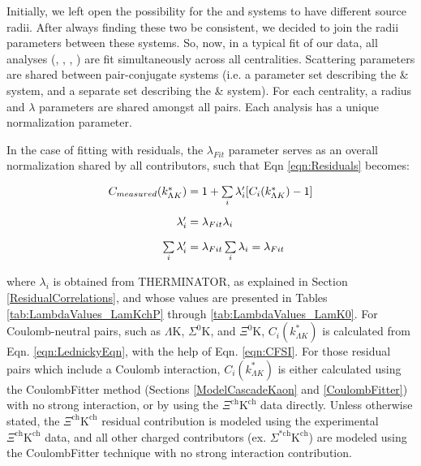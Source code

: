 \documentclass[../AnalysisNoteJBuxton.tex]{subfiles}
\begin{document}
Initially, we left open the possibility for the \LamKchPALamKchM and \LamKchMALamKchP systems to have different source radii.  After always finding these two be consistent, we decided to join the radii parameters between these systems.  So, now, in a typical fit of our \LamKpm data, all \LamKpm analyses (\LamKchP, \ALamKchM, \LamKchM, \ALamKchP) are fit simultaneously across all centralities.  Scattering parameters are shared between pair-conjugate systems (i.e. a parameter set describing the \LamKchP \& \ALamKchM system, and a separate set describing the \LamKchM \& \ALamKchP system).  For each centrality, a radius and $\lambda$ parameters are shared amongst all pairs.  Each analysis has a unique normalization parameter.

In the case of fitting with residuals, the $\lambda_{Fit}$ parameter serves as an overall normalization shared by all contributors, such that Eqn \ref{eqn:Residuals} becomes:

\begin{equation}
\begin{array}{r@{}l}
    C_{measured}(k^{*}_{\Lambda K}) &{}= 1 + \sum\limits_{i}\lambda_{i}'[C_{i}(k^{*}_{\Lambda K})-1]\\[15pt]
    \lambda_{i}' &{}= \lambda_{Fit}\lambda_{i} \\[10pt]
    \sum\limits_{i}\lambda_{i}' &{}=  \lambda_{Fit}\sum\limits_{i}\lambda_{i} = \lambda_{Fit}
\end{array}
\label{eqn:ResidualsvLambdaNorm}
\end{equation}

where $\lambda_{i}$ is obtained from THERMINATOR, as explained in Section \ref{ResidualCorrelations}, and whose values are presented in Tables \ref{tab:LambdaValues_LamKchP} through \ref{tab:LambdaValues_LamK0}.  For Coulomb-neutral pairs, such as $\Lambda$K, $\Sigma^{0}$K, and $\Xi^{0}$K, $C_{i}(k^{*}_{\Lambda K})$ is calculated from Eqn. \ref{eqn:LednickyEqn}, with the help of Eqn. \ref{eqn:CFSI}.  For those residual pairs which include a Coulomb interaction, $C_{i}(k^{*}_{\Lambda K})$ is either calculated using the CoulombFitter method (Sections \ref{ModelCascadeKaon} and \ref{CoulombFitter}) with no strong interaction, or by using the $\Xi^{\mathrm{ch}}\mathrm{K^{ch}}$ data directly.  Unless otherwise stated, the $\Xi^{\mathrm{ch}}\mathrm{K^{ch}}$ residual contribution is modeled using the experimental $\Xi^{\mathrm{ch}}\mathrm{K^{ch}}$ data, and all other charged contributors (ex. $\Sigma^{*\mathrm{ch}}\mathrm{K^{ch}}$) are modeled using the CoulombFitter technique with no strong interaction contribution.
\end{document}
